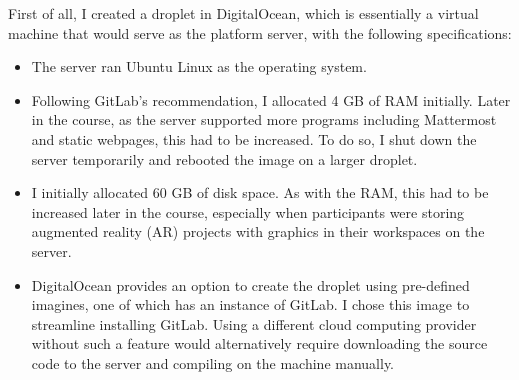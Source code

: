 \documentclass[12pt,twoside]{mitthesis}
\newcommand{\draft}[1]{{#1}}
\begin{document}
\draft{First of all, I created a droplet in DigitalOcean, which is essentially a virtual machine that would serve as the platform server, with the following specifications:
\begin{itemize}
	\item The server ran Ubuntu Linux as the operating system.
	\item Following GitLab's recommendation, I allocated 4 GB of RAM initially. Later in the course, as the server supported more programs including Mattermost and static webpages, this had to be increased. To do so, I shut down the server temporarily and rebooted the image on a larger droplet.
	\item I initially allocated 60 GB of disk space. As with the RAM, this had to be increased later in the course, especially when participants were storing augmented reality (AR) projects with graphics in their workspaces on the server.
	\item DigitalOcean provides an option to create the droplet using pre-defined imagines, one of which has an instance of GitLab. I chose this image to streamline installing GitLab. Using a different cloud computing provider without such a feature would alternatively require downloading the source code to the server and compiling on the machine manually.
\end{itemize}

}
\end{document}
